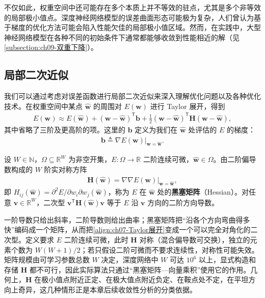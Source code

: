 \documentclass[../../main.tex]{subfiles}
\begin{document}
不仅如此，权重空间中还可能存在多个本质上并不等效的驻点，尤其是多个非等效的局部极小值点。深度神经网络模型的误差曲面形态可能极为复杂，人们曾认为基于梯度的优化方法可能会陷入性能欠佳的局部极小值区域。然而，在实践中，大型神经网络模型在各种不同的初始条件下通常都能够收敛到性能相近的解（见\cref{subsection:ch09-双重下降}）。

\subsection{局部二次近似}\label{subsection:ch07-局部二次近似}

我们可以通过考虑对误差函数进行局部二次近似来深入理解优化问题以及各种优化技术。在权重空间中某点 $\hat{\mathbf{w}}$ 的周围对 $E(\mathbf{w})$ 进行 Taylor 展开，得到
\begin{align}
E(\mathbf{w}) \approx E(\hat{\mathbf{w}})+(\mathbf{w}-\hat{\mathbf{w}})^{\mathsf T}\mathbf{b}+\frac{1}{2}(\mathbf{w}-\hat{\mathbf{w}})^{\mathsf T}\mathbf{H}(\mathbf{w}-\hat{\mathbf{w}}),
\label{align:ch07-Taylor展开}
\end{align}
其中省略了三阶及更高阶的项。这里的 $\mathbf{b}$ 定义为我们在 $\hat{\mathbf{w}}$ 处评估的 $E$ 的梯度：
\begin{align}
\mathbf{b} \triangleq \left.\nabla E(\mathbf{w})\right|_{\mathbf{w}=\hat{\mathbf{w}}}.
\label{align:ch07-梯度向量}
\end{align}

\begin{definition}[黑塞矩阵]\label{definition:ch07-黑塞矩阵}
设 $W\in\mathbb{N}$，$\Omega\subseteq\mathbb{R}^{W}$ 为非空开集，$E:\Omega\to\mathbb{R}$ 二阶连续可微，$\hat{\mathbf{w}}\in\Omega$。由二阶偏导数构成的 $W$ 阶实对称方阵
\begin{align}
\mathbf{H}(\hat{\mathbf{w}}) = \left.\nabla\nabla E(\mathbf{w})\right|_{\mathbf{w}=\hat{\mathbf{w}}},
\label{align:ch07-黑塞矩阵}
\end{align}
即 $H_{ij}(\hat{\mathbf{w}})=\partial^{2}E/\partial w_{i}\partial w_{j}(\hat{\mathbf{w}})$，称为 $E$ 在 $\hat{\mathbf{w}}$ 处的\textbf{黑塞矩阵}（Hessian）。对任意 $\mathbf{v}\in\mathbb{R}^{W}$，二次型 $\mathbf{v}^{\mathsf T}\mathbf{H}(\hat{\mathbf{w}})\mathbf{v}$ 等于 $E$ 沿 $\mathbf{v}$ 方向的二阶方向导数。
\end{definition}

\begin{remark}
一阶导数只给出斜率，二阶导数则给出曲率；黑塞矩阵把“沿各个方向弯曲得多快”编码成一个矩阵，从而把\eqref{align:ch07-Taylor展开}变成一个可以完全对角化的二次型。定义要求 $E$ 二阶连续可微，此时 $\mathbf{H}$ 对称（混合偏导数可交换），独立的元素个数为 $W(W+1)/2$；若只假设二阶可微而不要求连续性，对称性可能失效。矩阵规模由可学习参数总数 $W$ 决定，深度网络中 $W$ 可达 $10^{6}$ 以上，显式构造和存储 $\mathbf{H}$ 都不可行，因此实际算法只通过“黑塞矩阵—向量乘积”使用它的作用。几何上，$\mathbf{H}$ 在极小值点附近正定、在极大值点附近负定、在鞍点处不定，在平坦方向上奇异，这几种情形正是本章后续收敛性分析的分类依据。
\end{remark}
\end{document}
